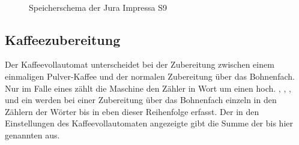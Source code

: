 \begin{figure}
    \centering%
    \textwidth%
    \\%
    \caption{Speicherschema der Jura Impressa S9}
    \label{fig:Speicherschema}
\end{figure}

\subsection{Kaffeezubereitung}\label{subsec:ErgebnisKaffeezubereitung}
Der Kaffeevollautomat unterscheidet bei der Zubereitung zwischen einem einmaligen Pulver-Kaffee und der normalen Zubereitung über das Bohnenfach.
Nur im Falle eines  zählt die Maschine den Zähler in Wort  um einen hoch.
, , ,  und ein  werden bei einer Zubereitung über das Bohnenfach einzeln in den Zählern der Wörter  bis  in eben dieser Reihenfolge erfasst.
Der in den Einstellungen des Kaffeevollautomaten angezeigte  gibt die Summe der bis hier genannten  aus.

